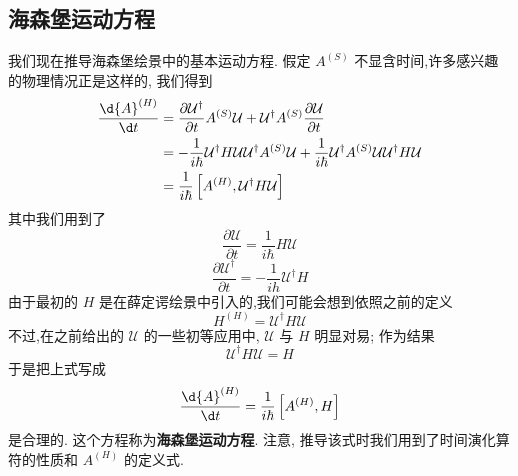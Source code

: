 \documentclass[lang=cn,newtx,10pt,scheme=chinese,thmcnt=section]{elegantbook}
\begin{document}
\subsection*{海森堡运动方程}
我们现在推导海森堡绘景中的基本运动方程. 假定 ${A}^{\left( S\right) }$ 不显含时间,许多感兴趣的物理情况正是这样的, 我们得到
\begin{equation}
	\begin{aligned}
		\frac{\d{A}^{\left( H\right) }}{\d t} &= \frac{\partial \mathcal{U}^{ \dagger }}{\partial t}{A}^{\left( S\right) }\mathcal{U} + \mathcal{U}^{ \dagger }{A}^{\left( S\right) }\frac{\partial\mathcal{U}}{\partial t}\\
		&= - \frac{1}{i\hbar }\mathcal{U}^{ \dagger }H\mathcal{U}\mathcal{U}^{ \dagger }{A}^{\left( S\right) }\mathcal{U} + \frac{1}{i\hbar }\mathcal{U}^{ \dagger }{A}^{\left( S\right) }\mathcal{U}\mathcal{U}^{ \dagger }{H\mathcal{U}}\\
		&= \frac{1}{i\hbar }\left\lbrack {{A}^{\left( H\right) },\mathcal{U}^{ \dagger }{H\mathcal{U}}}\right\rbrack
	\end{aligned}
\end{equation}
其中我们用到了
\begin{equation}
	\frac{\partial \mathcal{U}}{\partial t} = \frac{1}{i\hbar }{H\mathcal{U}}
\end{equation}
\begin{equation}
	\frac{\partial\mathcal{U}^\dagger}{\partial t} = - \frac{1}{ih}{\mathcal{U}}^\dagger H
\end{equation}
由于最初的 $H$ 是在薛定谔绘景中引入的,我们可能会想到依照之前的定义
\begin{equation}
	{H}^{\left( H\right) } = \mathcal{U}^\dagger{H\mathcal{U}}
\end{equation}
不过,在之前给出的 $\mathcal{U}$ 的一些初等应用中, $\mathcal{U}$ 与 $H$ 明显对易; 作为结果
\begin{equation}
	\mathcal{U}^\dagger{H\mathcal{U}} = H
\end{equation}
于是把上式写成
\begin{equation}\label{2.94}
	\frac{\d{A}^{\left( H\right) }}{\d t} = \frac{1}{i\hbar }\left\lbrack {{A}^{\left( H\right) }, H}\right\rbrack
\end{equation}
是合理的. 这个方程称为\textbf{海森堡运动方程}. 注意, 推导该式时我们用到了时间演化算符的性质和 ${A}^{\left( H\right) }$ 的定义式.
\end{document}
